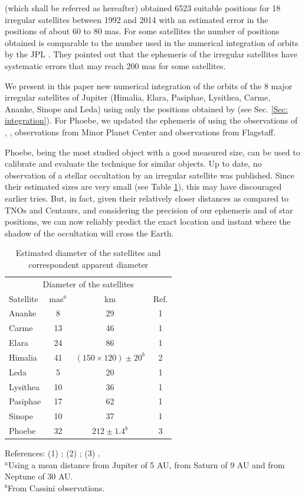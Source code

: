 \documentclass[useAMS,usenatbib]{mn2e}
\begin{document}
\cite{GomesJunior2015} (which shall be referred as  hereafter) obtained 6523 suitable positions for 18 irregular satellites between 1992 and 2014 with an estimated error in the positions of about 60 to 80 mas. For some satellites the number of positions obtained is comparable to the number used in the numerical integration of orbits by the JPL \citep{Jacobson2012}. They pointed out that the ephemeris of the irregular satellites have systematic errors that may reach 200 mas for some satellites.

We present in this paper new numerical integration of the orbits of the 8 major irregular satellites of Jupiter (Himalia, Elara, Pasiphae, Lysithea, Carme, Ananke, Sinope and Leda) using only the positions obtained by  (see Sec. \ref{Sec: integration}). For Phoebe, we updated the ephemeris of \cite{Desmars2013} using the observations of , \cite{Peng2015}, observations from Minor Planet Center and observations from Flagstaff. 

Phoebe, being the most studied object with a good measured size, can be used to calibrate and evaluate the technique for similar objects. Up to date, no observation of a stellar occultation by an irregular satellite was published. Since their estimated sizes are very small (see Table \ref{Tab: satellite-diameter}), this may have discouraged earlier tries. But, in fact, given their relatively closer distances as compared to TNOs and Centaurs, and considering the precision of our ephemeris and of star positions, we can now reliably predict the exact location and instant where the shadow of the occultation will cross the Earth.

\begin{table}
\caption{\label{Tab: satellite-diameter} Estimated diameter of the satellites and correspondent apparent diameter}
\begin{center}
\begin{tabular}{lccc}
\hline  \hline
\multicolumn{4}{c}{Diameter of the satellites} \tabularnewline
Satellite  & mas$^ {a}$  & km & Ref. \tabularnewline
\hline
Ananke & 8 & 29 & 1 \tabularnewline
Carme & 13 & 46 & 1 \tabularnewline
Elara & 24 & 86 & 1 \tabularnewline
Himalia & 41 & $(150\times120) \pm 20^{b}$ & 2 \tabularnewline
Leda & 5 & 20 & 1 \tabularnewline
Lysithea & 10 & 36 & 1 \tabularnewline
Pasiphae & 17 & 62 & 1 \tabularnewline
Sinope & 10 & 37 & 1 \tabularnewline
\hdashline
Phoebe & 32 & $212 \pm 1.4^{b}$ & 3 \tabularnewline
\hline
\end{tabular}
\end{center}
References: (1) \cite{Rettig2001}; (2) \cite{Porco2003}; (3) \cite{Thomas2010}.\\
$^{a}${Using a mean distance from Jupiter of 5 AU, from Saturn of 9 AU and from Neptune of 30 AU.}\\
$^{b}${From Cassini observations.}
\par
\end{table}
\end{document}
